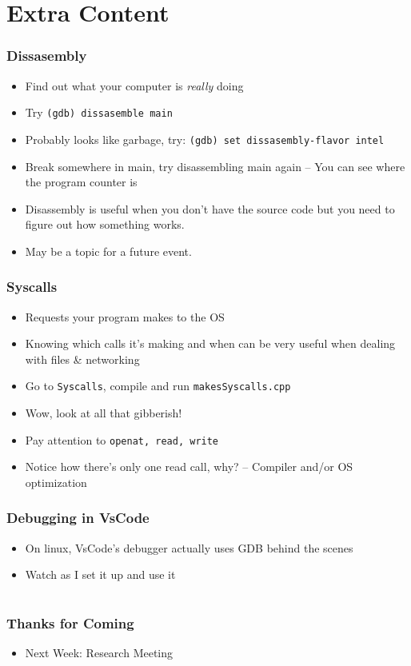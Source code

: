 \documentclass[aspectratio=169]{beamer}
\newcommand{\code}{\texttt}
\begin{document}
\section{Extra Content}
\begin{frame}
    \frametitle{Dissasembly}
    \begin{itemize}
        \item Find out what your computer is \textit{really} doing
        \item Try \code{(gdb) dissasemble main}
        \pause
        \item Probably looks like garbage, try: \code{(gdb) set dissasembly-flavor intel}
        \pause
        \item Break somewhere in main, try disassembling main again \break -- You can see where the program counter is
        \pause
        \item Disassembly is useful when you don't have the source code but you need to figure out how something works.
        \item May be a topic for a future event.
    \end{itemize}
\end{frame}
\begin{frame}
    \frametitle{Syscalls}
    \begin{itemize}
        \item Requests your program makes to the OS
        \item Knowing which calls it's making and when can be very useful when dealing with files \& networking
        \item Go to \code{Syscalls}, compile and run \code{makesSyscalls.cpp}
        \pause
        \item Wow, look at all that gibberish!
        \item Pay attention to \code{openat, read, write}
        \item Notice how there's only one read call, why? \pause -- Compiler and/or OS optimization
    \end{itemize}
\end{frame}
\begin{frame}
    \frametitle{Debugging in VsCode}

    \begin{itemize}
        \item On linux, VsCode's debugger actually uses GDB behind the scenes
        \item Watch as I set it up and use it
    \end{itemize}
\end{frame}
\section{}
\begin{frame}
    \frametitle{Thanks for Coming}
    \begin{itemize}
        \item Next Week: Research Meeting
    \end{itemize}
\end{frame}
\end{document}
